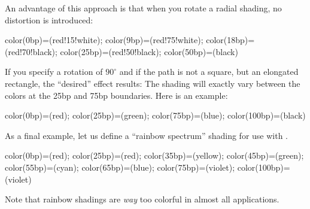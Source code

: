 \begin{command}{\pgfshadepath{}}
    An advantage of this approach is that when you rotate a radial shading, no
    distortion is introduced:
\begin{codeexample}[]
 {color(0bp)=(red!15!white); color(9bp)=(red!75!white);
 color(18bp)=(red!70!black); color(25bp)=(red!50!black); color(50bp)=(black)}
\hskip 1cm
\begin{pgfpicture}
  \pgfpathrectangle{\pgfpointorigin}{\pgfpoint{1cm}{1cm}}
  \pgfusepath{}
  \pgfpathcircle{\pgfpoint{3cm}{0cm}}{1cm}
  \pgfusepath{}
  \pgfpathcircle{\pgfpoint{6cm}{0cm}}{1cm}
  \pgfusepath{}
\end{pgfpicture}
\end{codeexample}

    If you specify a rotation of $90^\circ$ and if the path is not a square,
    but an elongated rectangle,  the ``desired'' effect results: The shading
    will exactly vary between the colors at the 25bp and 75bp boundaries. Here
    is an example:
\begin{codeexample}[]
 {color(0bp)=(red); color(25bp)=(green);  color(75bp)=(blue);  color(100bp)=(black)}
\begin{pgfpicture}
  \pgfpathrectangle{\pgfpointorigin}{\pgfpoint{2cm}{1cm}}
  \pgfpathrectangle{\pgfpoint{3cm}{0cm}}{\pgfpoint{2cm}{1cm}}
  \pgfpathrectangle{\pgfpoint{6cm}{0cm}}{\pgfpoint{2cm}{1cm}}
\end{pgfpicture}
\end{codeexample}

    As a final example, let us define a ``rainbow spectrum'' shading for use
    with \tikzname.
\begin{codeexample}[]
 {color(0bp)=(red); color(25bp)=(red); color(35bp)=(yellow);
  color(45bp)=(green); color(55bp)=(cyan); color(65bp)=(blue);
  color(75bp)=(violet); color(100bp)=(violet)}
\end{codeexample}

    Note that rainbow shadings are \emph{way} too colorful in almost all
    applications.
\end{command}

